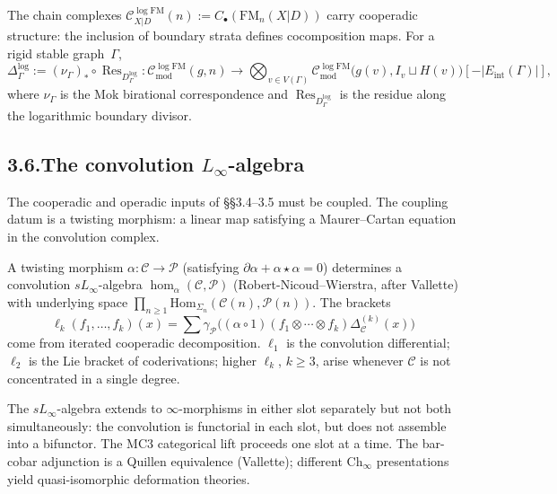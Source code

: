 \documentclass[11pt,reqno]{amsart}
\theoremstyle{definition}
\theoremstyle{remark}
\providecommand{\cC}{\mathcal{C}}
\providecommand{\cP}{\mathcal{P}}
\providecommand{\Hom}{\mathrm{Hom}}
\numberwithin{equation}{section}
\begin{document}
The chain complexes $\cC^{\log\mathrm{FM}}_{X|D}(n):=C_\bullet(\mathrm{FM}_n(X|D))$
carry cooperadic structure: the inclusion of boundary strata defines
cocomposition maps. For a rigid stable graph~$\Gamma$,
\[
\Delta^{\log}_\Gamma:=(\nu_\Gamma)_*\circ\operatorname{Res}_{D^{\log}_\Gamma}\colon\cC^{\log\mathrm{FM}}_{\mathrm{mod}}(g,n)\to\bigotimes_{v\in V(\Gamma)}\cC^{\log\mathrm{FM}}_{\mathrm{mod}}\bigl(g(v),I_v\sqcup H(v)\bigr)[-|E_{\mathrm{int}}(\Gamma)|],
\]
where $\nu_\Gamma$ is the Mok birational correspondence and
$\operatorname{Res}_{D^{\log}_\Gamma}$ is the residue along the
logarithmic boundary divisor.

\subsection*{3.6.\enspace The convolution $L_\infty$-algebra}

The cooperadic and operadic inputs of \S\S3.4--3.5 must be coupled.
The coupling datum is a twisting morphism: a linear map satisfying a
Maurer--Cartan equation in the convolution complex.

A twisting morphism $\alpha\colon\cC\to\cP$ (satisfying
$\partial\alpha+\alpha\star\alpha=0$) determines a convolution
$sL_\infty$-algebra $\operatorname{hom}_\alpha(\cC,\cP)$
(Robert-Nicoud--Wierstra, after Vallette) with underlying space
$\prod_{n\ge 1}\Hom_{\Sigma_n}(\cC(n),\cP(n))$. The brackets
\[
\ell_k(f_1,\ldots,f_k)(x)=\sum\gamma_\cP\bigl((\alpha\circ 1)(f_1\otimes\cdots\otimes f_k)\Delta^{(k)}_\cC(x)\bigr)
\]
come from iterated cooperadic decomposition. $\ell_1$ is the
convolution differential; $\ell_2$ is the Lie bracket of
coderivations; higher $\ell_k$, $k\ge 3$, arise whenever $\cC$ is not
concentrated in a single degree.

The $sL_\infty$-algebra extends to $\infty$-morphisms in either slot
separately but not both simultaneously: the convolution is
functorial in each slot, but does not assemble into a bifunctor. The
MC3 categorical lift proceeds one slot at a time. The bar-cobar
adjunction is a Quillen equivalence (Vallette); different
$\mathrm{Ch}_\infty$ presentations yield quasi-isomorphic
deformation theories.
\end{document}
